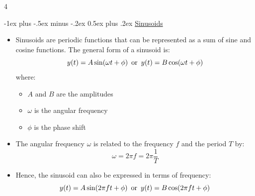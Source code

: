 \documentclass[10pt, landscape]{article}
\makeatletter
\renewcommand{\section}{\@startsection{section}{1}{0mm}%
  {-1ex plus -.5ex minus -.2ex}%
  {0.5ex plus .2ex}%
{\normalfont\large\bfseries}}
\makeatother
\begin{document}
\raggedright
\footnotesize
\begin{multicols*}{4}
  \setlength{\columnseprule}{0.25pt}

  \begin{center}
  \end{center}

  \section{\underline{Sinusoids}}

  \begin{itemize}
    \item Sinusoids are periodic functions that can be represented as a sum of sine and cosine functions. The general form of a sinusoid is:
    \begin{equation}
      y(t) = A \sin(\omega t + \phi) \hspace{5px} \text{or} \hspace{5px} y(t) = B \cos(\omega t + \phi)
    \end{equation}
    where:
    \begin{itemize}
      \item $A$ and $B$ are the amplitudes
      \item $\omega$ is the angular frequency
      \item $\phi$ is the phase shift
    \end{itemize}
    \item The angular frequency $\omega$ is related to the frequency $f$ and the period $T$ by:
    \begin{equation}
      \omega = 2\pi f = 2\pi \frac{1}{T}
    \end{equation}
    \item  Hence, the sinusoid can also be expressed in terms of frequency:
    \begin{equation}
      y(t) = A \sin(2\pi f t + \phi) \hspace{5px} \text{or} \hspace{5px} y(t) = B \cos(2\pi f t + \phi)
    \end{equation}
  \end{itemize}


\end{multicols*}
\end{document}
